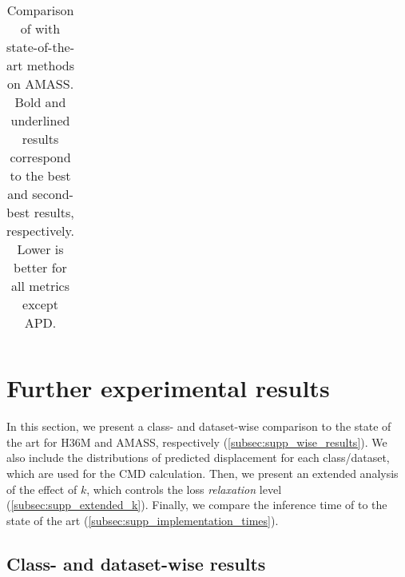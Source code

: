 \documentclass[10pt,twocolumn,letterpaper]{article}
\begin{document}
\begin{table}[t!]
\begin{tabular}{lccccccc@{\hskip 2mm}}
 \bottomrule
    \end{tabular}
    \caption{Comparison of \modelname{} with state-of-the-art methods on AMASS. Bold and underlined results correspond to the best and second-
best results, respectively. Lower is better for all metrics except APD.}
    \label{tab:supp_sota_comparison_amass}
\end{table}
\setlength{\tabcolsep}{6pt}


\section{Further experimental results}
\label{sec:supp_exp_results}

In this section, we present a class- and dataset-wise comparison to the state of the art for H36M and AMASS, respectively (\autoref{subsec:supp_wise_results}). We also include the distributions of predicted displacement for each class/dataset, which are used for the CMD calculation. Then, we present an extended analysis of the effect of $k$, which controls the loss \textit{relaxation} level (\autoref{subsec:supp_extended_k}).
Finally, we compare the inference time of \modelname{} to the state of the art (\autoref{subsec:supp_implementation_times}).




\subsection{Class- and dataset-wise results}
\label{subsec:supp_wise_results}
\end{document}
